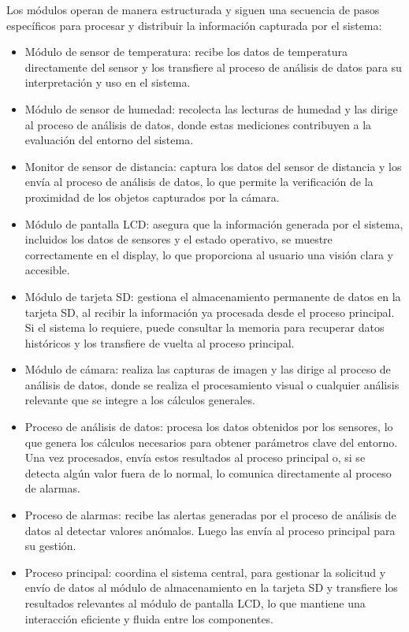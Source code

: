 Los módulos operan de manera estructurada y siguen una secuencia de pasos específicos para procesar y distribuir la información capturada por el sistema:

\begin{itemize}
\item Módulo de sensor de temperatura: recibe los datos de temperatura directamente del sensor y los transfiere al proceso de análisis de datos para su interpretación y uso en el sistema.
\item Módulo de sensor de humedad: recolecta las lecturas de humedad y las dirige al proceso de análisis de datos, donde estas mediciones contribuyen a la evaluación del entorno del sistema.
\item Monitor de sensor de distancia: captura los datos del sensor de distancia y los envía al proceso de análisis de datos, lo que permite la verificación de la proximidad de los objetos capturados por la cámara.
\item Módulo de pantalla LCD: asegura que la información generada por el sistema, incluidos los datos de sensores y el estado operativo, se muestre correctamente en el display, lo que proporciona al usuario una visión clara y accesible.

\newpage

\item Módulo de tarjeta SD: gestiona el almacenamiento permanente de datos en la tarjeta SD, al recibir la información ya procesada desde el proceso principal. Si el sistema lo requiere, puede consultar la memoria para recuperar datos históricos y los transfiere de vuelta al proceso principal.
\item Módulo de cámara: realiza las capturas de imagen y las dirige al proceso de análisis de datos, donde se realiza el procesamiento visual o cualquier análisis relevante que se integre a los cálculos generales.
\item Proceso de análisis de datos: procesa los datos obtenidos por los sensores, lo que genera los cálculos necesarios para obtener parámetros clave del entorno. Una vez procesados, envía estos resultados al proceso principal o, si se detecta algún valor fuera de lo normal, lo comunica directamente al proceso de alarmas.
\item Proceso de alarmas: recibe las alertas generadas por el proceso de análisis de datos al detectar valores anómalos. Luego las envía al proceso principal para su gestión.
\item Proceso principal: coordina el sistema central, para gestionar la solicitud y envío de datos al módulo de almacenamiento en la tarjeta SD y transfiere los resultados relevantes al módulo de pantalla LCD, lo que mantiene una interacción eficiente y fluida entre los componentes.
\end{itemize}

